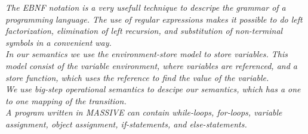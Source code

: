 \vspace{30pt}

\textit{The EBNF notation is a very usefull technique to descripe the grammar of a programming language. The use of regular expressions makes it possible to do left factorization, elimination of left recursion, and substitution of non-terminal symbols in a convenient way.\\ \indent
In our semantics we use the environment-store model to store variables. This model consist of the variable environment, where variables are referenced, and a store function, which uses the reference to find the value of the variable.\\ \indent
We use big-step operational semantics to descipe our semantics, which has a one to one mapping of the transition.\\ \indent
A program written in MASSIVE can contain while-loops, for-loops, variable assignment, object assignment, if-statements, and else-statements.}